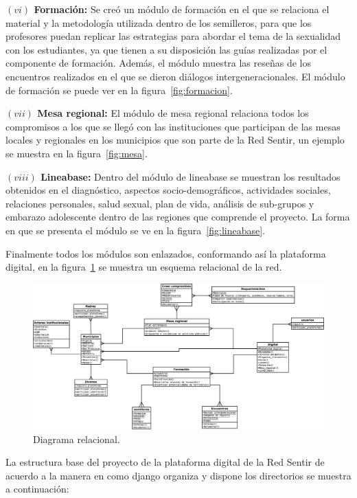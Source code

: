 \documentclass[journal,transmag]{IEEEtran}
\begin{document}
\textbf{$(vi)$ Formación:} Se creó un módulo de formación en el que se relaciona el material y la metodología utilizada dentro de los semilleros, para que los profesores puedan replicar las estrategias para abordar el tema de la sexualidad con los estudiantes, ya que tienen a su disposición las guías realizadas por el componente de formación. Además, el módulo muestra las reseñas de los encuentros realizados en el que se dieron diálogos intergeneracionales. El módulo de formación se puede ver en la figura~\ref{fig:formacion}.

\textbf{$(vii)$ Mesa regional:} El módulo de mesa regional relaciona todos los compromisos a los que se llegó con las instituciones que participan de las mesas locales y regionales en los municipios que son parte de la Red Sentir, un ejemplo se muestra en la figura~\ref{fig:mesa}.

\textbf{$(viii)$ Lineabase:} Dentro del módulo de lineabase se muestran los resultados obtenidos en el diagnóstico, aspectos socio-demográficos, actividades sociales, relaciones personales, salud sexual, plan de vida, análisis de sub-grupos y embarazo adolescente dentro de las regiones que comprende el proyecto. La forma en que se presenta el módulo se ve en la figura~\ref{fig:lineabase}.

Finalmente todos los módulos son enlazados, conformando así la plataforma digital, en la figura~\ref{fig:red} se muestra un esquema relacional de la red.

\begin{figure}[t]
\centering
\includegraphics[width=1\linewidth]{red.eps}
\caption{Diagrama relacional.}
\label{fig:red}
\end{figure}

La estructura base del proyecto de la plataforma digital de la Red Sentir de acuerdo a la manera en como django organiza y dispone los directorios se muestra a continuación:
\end{document}

